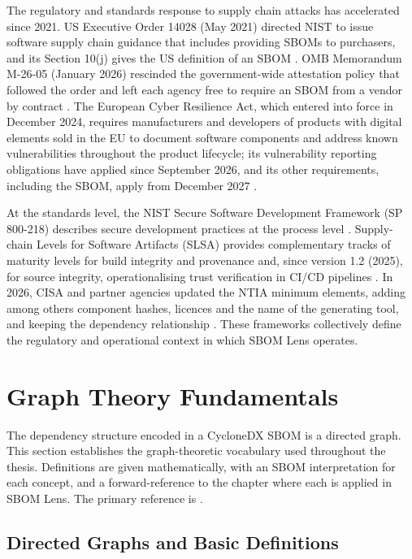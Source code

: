 The regulatory and standards response to supply chain attacks has accelerated since 2021. US Executive Order 14028 (May 2021) directed NIST to issue software supply chain guidance that includes providing SBOMs to purchasers, and its Section 10(j) gives the US definition of an SBOM \citep{EO14028}. OMB Memorandum M-26-05 (January 2026) rescinded the government-wide attestation policy that followed the order and left each agency free to require an SBOM from a vendor by contract \citep{OMB_M2605}. The European Cyber Resilience Act, which entered into force in December 2024, requires manufacturers and developers of products with digital elements sold in the EU to document software components and address known vulnerabilities throughout the product lifecycle; its vulnerability reporting obligations have applied since September 2026, and its other requirements, including the SBOM, apply from December 2027 \citep{CRA2024}.

At the standards level, the NIST Secure Software Development Framework (SP 800-218) describes secure development practices at the process level \citep{NIST_SSDF}. Supply-chain Levels for Software Artifacts (SLSA) provides complementary tracks of maturity levels for build integrity and provenance and, since version 1.2 (2025), for source integrity, operationalising trust verification in CI/CD pipelines \citep{SLSA}. In 2026, CISA and partner agencies updated the NTIA minimum elements, adding among others component hashes, licences and the name of the generating tool, and keeping the dependency relationship \citep{CISA2026SBOM}. These frameworks collectively define the regulatory and operational context in which SBOM Lens operates.


\section{Graph Theory Fundamentals}
\label{sec:graph-theory}

The dependency structure encoded in a CycloneDX SBOM is a directed graph. This section establishes the graph-theoretic vocabulary used throughout the thesis. Definitions are given mathematically, with an SBOM interpretation for each concept, and a forward-reference to the chapter where each is applied in SBOM Lens. The primary reference is \citet{CLRS4th}.


\subsection{Directed Graphs and Basic Definitions}
\label{sec:directed-graphs}

